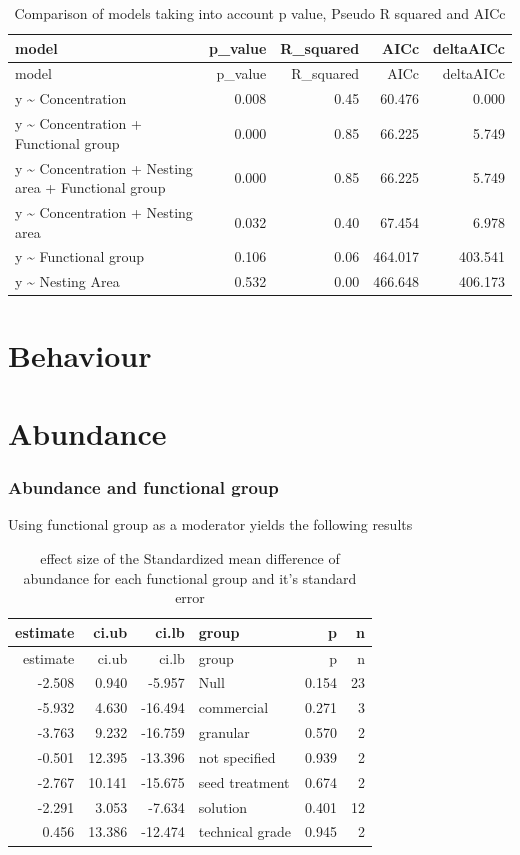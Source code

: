 \documentclass[]{elsarticle} %
\begin{document}
\begin{longtable}[c]{@{}lrrrr@{}}
\caption{Comparison of models taking into account p value, Pseudo R
squared and AICc}\tabularnewline
\toprule
model & p\_value & R\_squared & AICc & deltaAICc\tabularnewline
\midrule
\endfirsthead
\toprule
model & p\_value & R\_squared & AICc & deltaAICc\tabularnewline
\midrule
\endhead
y \textasciitilde{} Concentration & 0.008 & 0.45 & 60.476 &
0.000\tabularnewline
y \textasciitilde{} Concentration + Functional group & 0.000 & 0.85 &
66.225 & 5.749\tabularnewline
y \textasciitilde{} Concentration + Nesting area + Functional group &
0.000 & 0.85 & 66.225 & 5.749\tabularnewline
y \textasciitilde{} Concentration + Nesting area & 0.032 & 0.40 & 67.454
& 6.978\tabularnewline
y \textasciitilde{} Functional group & 0.106 & 0.06 & 464.017 &
403.541\tabularnewline
y \textasciitilde{} Nesting Area & 0.532 & 0.00 & 466.648 &
406.173\tabularnewline
\bottomrule
\end{longtable}

\section{Behaviour}\label{behaviour}

\section{Abundance}\label{abundance-1}

\subsubsection{Abundance and functional
group}\label{abundance-and-functional-group-1}

Using functional group as a moderator yields the following results

\begin{longtable}[c]{@{}rrrlrr@{}}
\caption{effect size of the Standardized mean difference of abundance
for each functional group and it's standard error}\tabularnewline
\toprule
estimate & ci.ub & ci.lb & group & p & n\tabularnewline
\midrule
\endfirsthead
\toprule
estimate & ci.ub & ci.lb & group & p & n\tabularnewline
\midrule
\endhead
-2.508 & 0.940 & -5.957 & Null & 0.154 & 23\tabularnewline
-5.932 & 4.630 & -16.494 & commercial & 0.271 & 3\tabularnewline
-3.763 & 9.232 & -16.759 & granular & 0.570 & 2\tabularnewline
-0.501 & 12.395 & -13.396 & not specified & 0.939 & 2\tabularnewline
-2.767 & 10.141 & -15.675 & seed treatment & 0.674 & 2\tabularnewline
-2.291 & 3.053 & -7.634 & solution & 0.401 & 12\tabularnewline
0.456 & 13.386 & -12.474 & technical grade & 0.945 & 2\tabularnewline
\bottomrule
\end{longtable}
\end{document}

